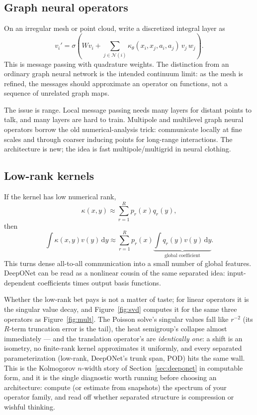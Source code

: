 \documentclass[10pt,a4paper]{article}
\newcommand{\dd}{\mathrm{d}}
\begin{document}
\subsection{Graph neural operators}

On an irregular mesh or point cloud, write a discretized integral layer as
\[
  v_i' =
  \sigma\!\left(
    Wv_i + \sum_{j \in \mathcal{N}(i)}
    \kappa_\theta(x_i,x_j,a_i,a_j)\,v_j\,w_j
  \right).
\]
This is message passing with quadrature weights. The distinction from an
ordinary graph neural network is the intended continuum limit: as the mesh is
refined, the messages should approximate an operator on functions, not a
sequence of unrelated graph maps.

The issue is range. Local message passing needs many layers for distant
points to talk, and many layers are hard to train. Multipole and multilevel
graph neural operators borrow the old numerical-analysis trick: communicate
locally at fine scales and through coarser inducing points for long-range
interactions. The architecture is new; the idea is fast multipole/multigrid
in neural clothing.

\subsection{Low-rank kernels}

If the kernel has low numerical rank,
\[
  \kappa(x,y) \approx \sum_{r=1}^R p_r(x)q_r(y),
\]
then
\[
  \int \kappa(x,y)v(y)\,\dd y
  \approx
  \sum_{r=1}^R p_r(x)
  \underbrace{\int q_r(y)v(y)\,\dd y}_{\text{global coefficient}}.
\]
This turns dense all-to-all communication into a small number of global
features. DeepONet can be read as a nonlinear cousin of the same separated
idea: input-dependent coefficients times output basis functions.

Whether the low-rank bet pays is not a matter of taste; for linear
operators it is the singular value decay, and Figure~\ref{fig:svd}
computes it for the same three operators as Figure~\ref{fig:mult}. The
Poisson solve's singular values fall like $r^{-2}$ (its $R$-term
truncation error is the tail), the heat semigroup's collapse almost
immediately --- and the translation operator's are \emph{identically one}:
a shift is an isometry, no finite-rank kernel approximates it uniformly,
and every separated parameterization (low-rank, DeepONet's trunk span,
POD) hits the same wall. This is the Kolmogorov $n$-width story of
Section~\ref{sec:deeponet} in computable form, and it is the single
diagnostic worth running before choosing an architecture: compute (or
estimate from snapshots) the spectrum of your operator family, and read
off whether separated structure is compression or wishful thinking.
\end{document}
